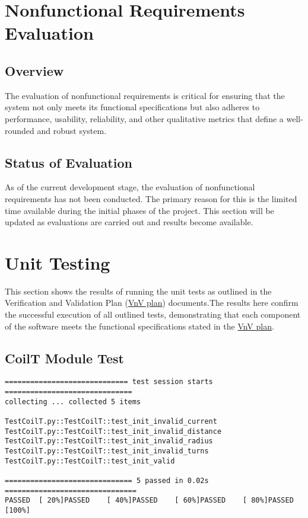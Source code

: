 \documentclass[12pt, titlepage]{article}
\begin{document}
\section{Nonfunctional Requirements Evaluation}

\subsection{Overview}
The evaluation of nonfunctional requirements is critical for ensuring that the system not only meets its functional specifications but also adheres to performance, usability, reliability, and other qualitative metrics that define a well-rounded and robust system. 

\subsection{Status of Evaluation}
As of the current development stage, the evaluation of nonfunctional requirements has not been conducted. The primary reason for this is the limited time available during the initial phases of the project. This section will be updated as evaluations are carried out and results become available.


\section{Unit Testing}

This section shows the results of running the unit tests as outlined in the Verification and Validation Plan (\href{https://github.com/rnorouziani/3D-H3C/blob/main/docs/VnVPlan/VnVPlan.pdf}{VnV plan}) documents.The results here confirm the successful execution of all outlined tests, demonstrating that each component of the software meets the functional specifications stated in the \href{https://github.com/rnorouziani/3D-H3C/blob/main/docs/VnVPlan/VnVPlan.pdf}{VnV plan}.


\subsection{CoilT Module Test}
\begin{small}
\begin{verbatim}
============================= test session starts ==============================
collecting ... collected 5 items

TestCoilT.py::TestCoilT::test_init_invalid_current 
TestCoilT.py::TestCoilT::test_init_invalid_distance 
TestCoilT.py::TestCoilT::test_init_invalid_radius 
TestCoilT.py::TestCoilT::test_init_invalid_turns 
TestCoilT.py::TestCoilT::test_init_valid 

============================== 5 passed in 0.02s ===============================
PASSED	[ 20%]PASSED	[ 40%]PASSED	[ 60%]PASSED	[ 80%]PASSED	[100%]

\end{verbatim}
\end{small}
\end{document}
